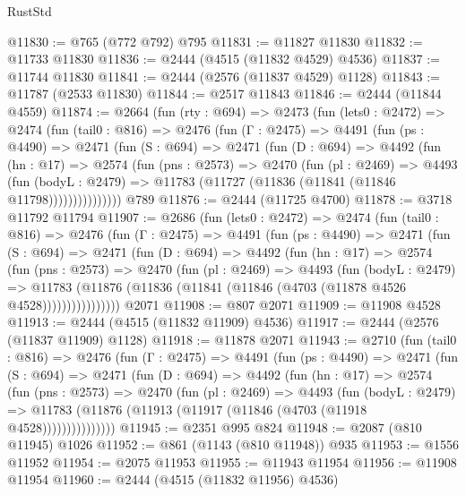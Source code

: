 \begin{lexlean}{RustStd}
\begin{coremodule}
@11830 := @765 (@772 @792) @795
@11831 := @11827 @11830
@11832 := @11733 @11830
@11836 := @2444 (@4515 (@11832 @4529) @4536)
@11837 := @11744 @11830
@11841 := @2444 (@2576 (@11837 @4529) @1128)
@11843 := @11787 (@2533 @11830)
@11844 := @2517 @11843
@11846 := @2444 (@11844 @4559)
@11874 := @2664
    (fun (rty : @694) =>
    @2473
      (fun (lets0 : @2472) =>
      @2474
        (fun (tail0 : @816) =>
        @2476
          (fun (Γ : @2475) =>
          @4491
            (fun (ps : @4490) =>
            @2471
              (fun (S : @694) =>
              @2471
                (fun (D : @694) =>
                @4492
                  (fun (hn : @17) =>
                  @2574
                    (fun (pns : @2573) =>
                    @2470
                      (fun (pl : @2469) =>
                      @4493
                        (fun (bodyL : @2479) =>
                        @11783 (@11727 (@11836 (@11841 (@11846 @11798)))))))))))))))
    @789
@11876 := @2444 (@11725 @4700)
@11878 := @3718 @11792 @11794
@11907 := @2686
    (fun (lets0 : @2472) =>
    @2474
      (fun (tail0 : @816) =>
      @2476
        (fun (Γ : @2475) =>
        @4491
          (fun (ps : @4490) =>
          @2471
            (fun (S : @694) =>
            @2471
              (fun (D : @694) =>
              @4492
                (fun (hn : @17) =>
                @2574
                  (fun (pns : @2573) =>
                  @2470
                    (fun (pl : @2469) =>
                    @4493
                      (fun (bodyL : @2479) =>
                      @11783
                        (@11876 (@11836 (@11841 (@11846 (@4703 (@11878 @4526 @4528))))))))))))))))
    @2071
@11908 := @807 @2071
@11909 := @11908 @4528
@11913 := @2444 (@4515 (@11832 @11909) @4536)
@11917 := @2444 (@2576 (@11837 @11909) @1128)
@11918 := @11878 @2071
@11943 := @2710
    (fun (tail0 : @816) =>
    @2476
      (fun (Γ : @2475) =>
      @4491
        (fun (ps : @4490) =>
        @2471
          (fun (S : @694) =>
          @2471
            (fun (D : @694) =>
            @4492
              (fun (hn : @17) =>
              @2574
                (fun (pns : @2573) =>
                @2470
                  (fun (pl : @2469) =>
                  @4493
                    (fun (bodyL : @2479) =>
                    @11783 (@11876 (@11913 (@11917 (@11846 (@4703 (@11918 @4528)))))))))))))))
@11945 := @2351 @995 @824
@11948 := @2087 (@810 @11945) @1026
@11952 := @861 (@1143 (@810 @11948)) @935
@11953 := @1556 @11952
@11954 := @2075 @11953
@11955 := @11943 @11954
@11956 := @11908 @11954
@11960 := @2444 (@4515 (@11832 @11956) @4536)

\end{coremodule}
\end{lexlean}
